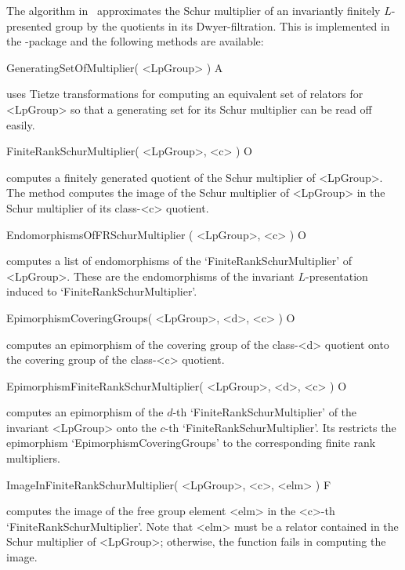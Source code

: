 

The algorithm in~\cite{Har09} approximates the Schur multiplier of
an invariantly finitely $L$-presented group by the quotients in its
Dwyer-filtration. This is implemented in the \NQL-package and the
following methods are available:

\> GeneratingSetOfMultiplier( <LpGroup> ) A

uses Tietze transformations for computing an equivalent set of relators
for <LpGroup> so that a generating set for its Schur multiplier can be
read off easily.

\> FiniteRankSchurMultiplier( <LpGroup>, <c> ) O

computes a finitely generated quotient of the Schur multiplier of
<LpGroup>. The method computes the image of the Schur multiplier of
<LpGroup> in the Schur multiplier of its class-<c> quotient.

\> EndomorphismsOfFRSchurMultiplier ( <LpGroup>, <c> )  O

computes a list of endomorphisms of the `FiniteRankSchurMultiplier' of
<LpGroup>. These are the endomorphisms of the invariant $L$-presentation
induced to `FiniteRankSchurMultiplier'.

\> EpimorphismCoveringGroups( <LpGroup>, <d>, <c> ) O

computes an epimorphism of the covering group of the class-<d> quotient
onto the covering group of the class-<c> quotient.

\> EpimorphismFiniteRankSchurMultiplier( <LpGroup>, <d>, <c> ) O

computes an epimorphism of the $d$-th `FiniteRankSchurMultiplier' of
the invariant <LpGroup> onto the $c$-th `FiniteRankSchurMultiplier'.
Its restricts the epimorphism `EpimorphismCoveringGroups' to the
corresponding finite rank multipliers.

\> ImageInFiniteRankSchurMultiplier( <LpGroup>, <c>, <elm> ) F

computes the image of the free group element <elm> in the <c>-th
`FiniteRankSchurMultiplier'. Note that <elm> must be a relator contained
in the Schur multiplier of <LpGroup>; otherwise, the function fails in
computing the image.

